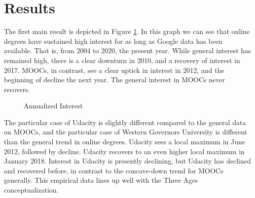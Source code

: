 \documentclass[review]{elsarticle}
\begin{document}
    \section{Results}

    The first main result is depicted in Figure \ref{fig:google_trends_digital_education}.
    In this graph we can see that online degrees have sustained high interest for as long as Google data has been available.
    That is, from 2004 to 2020, the present year.
    While general interest has remained high, there is a clear downturn in 2010, and a recovery of interest in 2017.
    MOOCs, in contrast, see a clear uptick in interest in 2012, and the beginning of decline the next year.
    The general interest in MOOCs never recovers.

    \begin{figure}[h!]
        \centering
        \caption{Annualized Interest}
    

        \label{fig:google_trends_digital_education}
        \end{figure}

    The particular case of Udacity is slightly different compared to the general data on MOOCs,
    and the particular case of Western Governors University is different than the general trend in online degrees.
    Udacity sees a local maximum in June 2012, followed by decline.
    Udacity recovers to an even higher local maximum in January 2018.
    Interest in Udacity is presently declining, but Udacity has declined and recovered before,
    in contrast to the concave-down trend for MOOCs generally.
    This empirical data lines up well with the Three Ages conceptualization.
\end{document}
